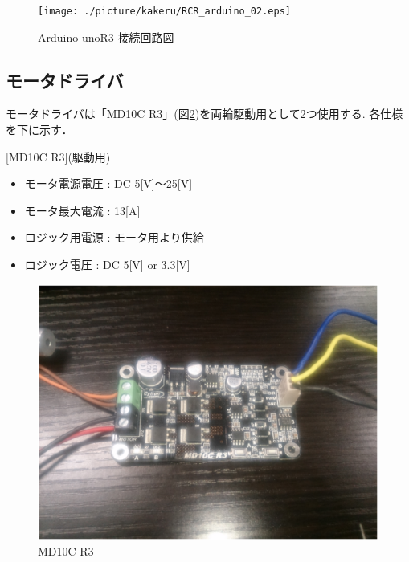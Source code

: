 \documentclass[11pt,a4]{jsarticle}
\begin{document}
\begin{figure}[h]
 \centering
 \texttt{[image: ./picture/kakeru/RCR\_arduino\_02.eps]}
    \caption{Arduino unoR3 接続回路図}
    \label{c_arduino}
\end{figure}
\newpage

\newpage
\subsection{モータドライバ}
モータドライバは「MD10C R3」(図\ref{MD10C})を両輪駆動用として2つ使用する.
各仕様を下に示す．

[MD10C R3](駆動用)
\begin{itemize}
 \item モータ電源電圧 : DC 5[V]$〜$25[V]
 \item モータ最大電流 : 13[A]
 \item ロジック用電源 : モータ用より供給
 \item ロジック電圧   : DC 5[V] or 3.3[V]
\end{itemize}

\begin{figure}[h]
 \centering
 \includegraphics[width=0.5\hsize]{./picture/kakeru/MD10C.eps}
    \caption{MD10C R3}
    \label{MD10C}
\end{figure}
\end{document}
